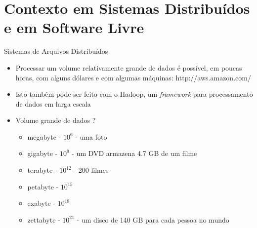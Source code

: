  \section{Contexto em Sistemas Distribuídos e em Software Livre}

  \begin{frame}{Sistemas de Arquivos Distribuídos}
     \begin{itemize}
      \item<1-> Processar um volume relativamente grande de dados é possível, em poucas horas, com alguns dólares e com algumas máquinas: http://aws.amazon.com/
      \item<2-> Isto também pode ser feito com o Hadoop, um \emph{framework} para processamento de dados em larga escala
      \item<3-> Volume grande de dados ?
          \begin{itemize}
             \item<4-> megabyte - $10^6$ - uma foto
             \item<5-> gigabyte - $10^9$ - um DVD armazena 4.7 GB de um filme
             \item<6-> terabyte - $10^{12}$ - 200 filmes
             \item<7-> petabyte - $10^{15}$
             \item<8-> exabyte - $10^{18}$
             \item<9-> zettabyte - $10^{21}$ - um disco de 140 GB para cada pessoa no mundo
          \end{itemize}
     \end{itemize}
  \end{frame}

